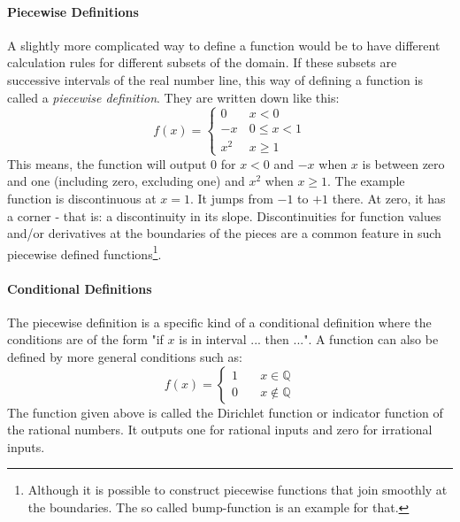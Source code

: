 \paragraph{Piecewise Definitions}
A slightly more complicated way to define a function would be to have different calculation rules for different subsets of the domain. If these subsets are successive intervals of the real number line, this way of defining a function is called a \emph{piecewise definition}. They are written down like this:
\begin{equation}
f(x) = 
\begin{cases} 
 0 \quad& x < 0 \\
 -x     & 0   \leq x < 1 \\
 x^2    & x \geq 1
\end{cases}
\end{equation}
This means, the function will output $0$ for $x < 0$ and $-x$ when $x$ is between zero and one (including zero, excluding one) and $x^2$ when $x \geq 1$. The example function is discontinuous at $x=1$. It jumps from $-1$ to $+1$ there. At zero, it has a corner - that is: a discontinuity in its slope. Discontinuities for function values and/or derivatives at the boundaries of the pieces are a common feature in such piecewise defined functions\footnote{Although it is possible to construct piecewise functions that join smoothly at the boundaries. The so called bump-function is an example for that.}.


\paragraph{Conditional Definitions}
The piecewise definition is a specific kind of a conditional definition where the conditions are of the form "if $x$ is in interval ... then ...". A function can also be defined by more general conditions such as:
\begin{equation}
f(x) = 
\begin{cases} 
 1 \quad& x \in    \mathbb{Q} \\
 0      & x \notin \mathbb{Q}
\end{cases}
\end{equation}
The function given above is called the Dirichlet function or indicator function of the rational numbers. It outputs one for rational inputs and zero for irrational inputs.

